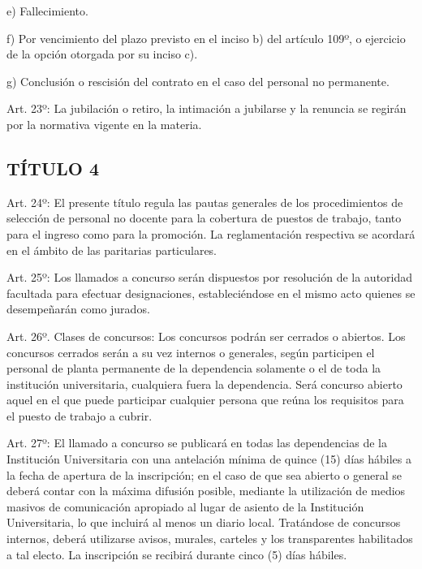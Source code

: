 \documentclass[]{article}
\begin{document}
e) Fallecimiento.

f) Por vencimiento del plazo previsto en el inciso b) del artículo 109º,
o ejercicio de la opción otorgada por su inciso c).

g) Conclusión o rescisión del contrato en el caso del personal no
permanente.

Art. 23º: La jubilación o retiro, la intimación a jubilarse y la
renuncia se regirán por la normativa vigente en la materia.

\subsection{TÍTULO 4}\label{tuxedtulo-4}


Art. 24º: El presente título regula las pautas generales de los
procedimientos de selección de personal no docente para la cobertura de
puestos de trabajo, tanto para el ingreso como para la promoción. La
reglamentación respectiva se acordará en el ámbito de las paritarias
particulares.

Art. 25º: Los llamados a concurso serán dispuestos por resolución de la
autoridad facultada para efectuar designaciones, estableciéndose en el
mismo acto quienes se desempeñarán como jurados.

Art. 26º. Clases de concursos: Los concursos podrán ser cerrados o
abiertos. Los concursos cerrados serán a su vez internos o generales,
según participen el personal de planta permanente de la dependencia
solamente o el de toda la institución universitaria, cualquiera fuera la
dependencia. Será concurso abierto aquel en el que puede participar
cualquier persona que reúna los requisitos para el puesto de trabajo a
cubrir.

Art. 27º: El llamado a concurso se publicará en todas las dependencias
de la Institución Universitaria con una antelación mínima de quince (15)
días hábiles a la fecha de apertura de la inscripción; en el caso de que
sea abierto o general se deberá contar con la máxima difusión posible,
mediante la utilización de medios masivos de comunicación apropiado al
lugar de asiento de la Institución Universitaria, lo que incluirá al
menos un diario local. Tratándose de concursos internos, deberá
utilizarse avisos, murales, carteles y los transparentes habilitados a
tal electo. La inscripción se recibirá durante cinco (5) días hábiles.
\end{document}
